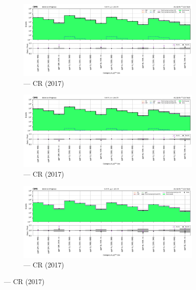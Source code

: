 \begin{figure}[htbp]
    \centering
    \begin{subfigure}[b]{0.66\textwidth}
        \includegraphics[width=\textwidth]{chapters/higgstoinv/figures/mountain_ranges/2017/ggF/Wmunu_tree_fit_s-abs_values_ggF_cats.pdf}
        \caption{\ggH --- \singleMuCr \gls{CR} (2017)}
    \end{subfigure}

    \begin{subfigure}[b]{0.66\textwidth}
        \includegraphics[width=\textwidth]{chapters/higgstoinv/figures/mountain_ranges/2017/ggF/Wenu_tree_fit_s-abs_values_ggF_cats.pdf}
        \caption{\ggH --- \singleEleCr \gls{CR} (2017)}
    \end{subfigure}

    \begin{subfigure}[b]{0.66\textwidth}
        \includegraphics[width=\textwidth]{chapters/higgstoinv/figures/mountain_ranges/2017/ggF/Zmumu_tree_fit_s-abs_values_ggF_cats.pdf}
        \caption{\ggH --- \doubleMuCr \gls{CR} (2017)}
    \end{subfigure}


\end{figure}
